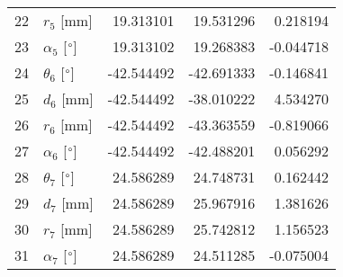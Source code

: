 \documentclass{standalone}%
\begin{document}
\begin{tabular}{llrrr}
22 &              $r_{5}$ [mm] &  19.313101 &  19.531296 &   0.218194 \\
23 &  $\alpha_{5}$ [$\degree$] &  19.313102 &  19.268383 &  -0.044718 \\
24 &  $\theta_{6}$ [$\degree$] & -42.544492 & -42.691333 &  -0.146841 \\
25 &              $d_{6}$ [mm] & -42.544492 & -38.010222 &   4.534270 \\
26 &              $r_{6}$ [mm] & -42.544492 & -43.363559 &  -0.819066 \\
27 &  $\alpha_{6}$ [$\degree$] & -42.544492 & -42.488201 &   0.056292 \\
28 &  $\theta_{7}$ [$\degree$] &  24.586289 &  24.748731 &   0.162442 \\
29 &              $d_{7}$ [mm] &  24.586289 &  25.967916 &   1.381626 \\
30 &              $r_{7}$ [mm] &  24.586289 &  25.742812 &   1.156523 \\
31 &  $\alpha_{7}$ [$\degree$] &  24.586289 &  24.511285 &  -0.075004 \\
\bottomrule
\end{tabular}
%
\end{document}
